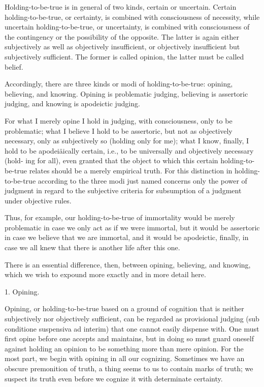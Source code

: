 Holding-to-be-true is in general of two kinds, certain or uncertain.
Certain holding-to-be-true, or certainty, is
combined with consciousness of necessity,
while uncertain holding-to-be-true, or uncertainty, is
combined with consciousness of the contingency
or the possibility of the opposite.
The latter is again either subjectively
as well as objectively insufficient,
or objectively insufficient but subjectively sufficient.
The former is called opinion, the latter must be called belief.

Accordingly, there are three kinds or modi of holding-to-be-true:
opining, believing, and knowing.
Opining is problematic judging,
believing is assertoric judging,
and knowing is apodeictic judging.

For what I merely opine I hold in judging, with consciousness, only to be problematic;
what I believe I hold to be assertoric, but not as objectively necessary, only as
subjectively so (holding only for me); what I know, finally, I hold to be
apodeiäically certain, i.e., to be universally and objectively necessary (hold-
ing for all), even granted that the object to which this certain holding-to-
be-true relates should be a merely empirical truth. For this distinction in
holding-to-be-true according to the three modi just named concerns only
the power of judgment in regard to the subjective criteria for subsumption of
a judgment under objective rules.

Thus, for example, our holding-to-be-true of immortality would be
merely problematic in case we only act as if we were immortal,
but it would be assertoric in case we believe that we are immortal,
and it would be apodeictic, finally, in case we all knew that
there is another life after this one.

There is an essential difference, then, between opining, believing, and knowing,
which we wish to expound more exactly and in more detail here.

1. Opining.

Opining, or holding-to-be-true based on a ground of cognition
that is neither subjectively nor objectively sufficient, can be regarded
as provisional judging (sub conditione suspensiva ad interim) that
one cannot easily dispense with.
One must first opine before one accepts and maintains,
but in doing so must guard oneself against holding an opinion to be
something more than mere opinion.
For the most part, we begin with
opining in all our cognizing. Sometimes we have an obscure premonition
of truth, a thing seems to us to contain marks of truth; we suspect its truth
even before we cognize it with determinate certainty.

